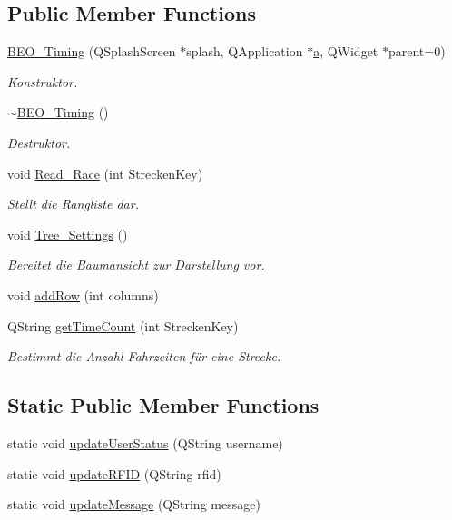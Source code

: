 \subsection*{Public Member Functions}
\begin{CompactItemize}
\item 
\hyperlink{class_b_e_o___timing_1adf7a002a9712fefe2f68007d2112e9}{BEO\_\-Timing} (QSplashScreen $\ast$splash, QApplication $\ast$\hyperlink{class_b_e_o___timing_8d2d841d6eb959c49a406ecebeb3374d}{a}, QWidget $\ast$parent=0)
\begin{CompactList}\small\item\em Konstruktor. \item\end{CompactList}\item 
\hyperlink{class_b_e_o___timing_1a251548e7f861c3a74fe34941586519}{$\sim$BEO\_\-Timing} ()
\begin{CompactList}\small\item\em Destruktor. \item\end{CompactList}\item 
void \hyperlink{class_b_e_o___timing_b54fe6db69d9304c6c27bf3b4c253196}{Read\_\-Race} (int StreckenKey)
\begin{CompactList}\small\item\em Stellt die Rangliste dar. \item\end{CompactList}\item 
void \hyperlink{class_b_e_o___timing_cd19a9b93fb9492e5ed537a8bc15af45}{Tree\_\-Settings} ()
\begin{CompactList}\small\item\em Bereitet die Baumansicht zur Darstellung vor. \item\end{CompactList}\item 
void \hyperlink{class_b_e_o___timing_03a5745ceba3fd3d69f9a0ea722f7e51}{addRow} (int columns)
\item 
QString \hyperlink{class_b_e_o___timing_4ca53b436da6fdf16737147cfaf69f87}{getTimeCount} (int StreckenKey)
\begin{CompactList}\small\item\em Bestimmt die Anzahl Fahrzeiten für eine Strecke. \item\end{CompactList}\end{CompactItemize}
\subsection*{Static Public Member Functions}
\begin{CompactItemize}
\item 
static void \hyperlink{class_b_e_o___timing_1f2db201ed52a7cd88c0b7b3c2113f2f}{updateUserStatus} (QString username)
\item 
static void \hyperlink{class_b_e_o___timing_394c0e847c9a363fd1eb8c1e00404115}{updateRFID} (QString rfid)
\item 
static void \hyperlink{class_b_e_o___timing_ab6e90f89fdd1a266ef14556a97c4212}{updateMessage} (QString message)
\end{CompactItemize}
